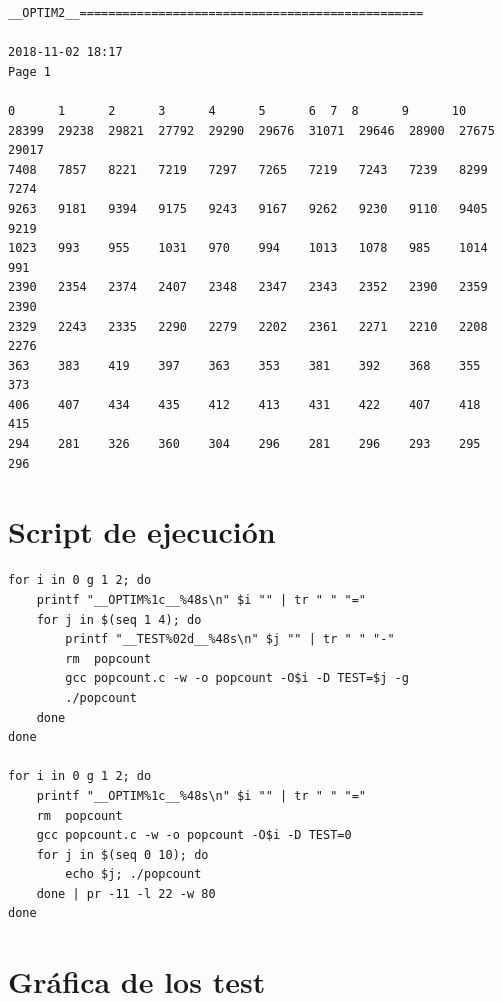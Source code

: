 \begin{lstlisting}[frame=single]
__OPTIM2__================================================

2018-11-02 18:17                                                          Page 1

0      1      2	     3	    4	   5	  6	 7	8      9      10
28399  29238  29821  27792  29290  29676  31071	 29646	28900  27675  29017
7408   7857   8221   7219   7297   7265	  7219	 7243	7239   8299   7274
9263   9181   9394   9175   9243   9167	  9262	 9230	9110   9405   9219
1023   993    955    1031   970	   994	  1013	 1078	985    1014   991
2390   2354   2374   2407   2348   2347	  2343	 2352	2390   2359   2390
2329   2243   2335   2290   2279   2202	  2361	 2271	2210   2208   2276
363    383    419    397    363	   353	  381	 392	368    355    373
406    407    434    435    412	   413	  431	 422	407    418    415
294    281    326    360    304	   296	  281	 296	293    295    296
	\end{lstlisting}

	\section[Script de ejecución]{Script de ejecución}

	\lstset{language=bash}
	\begin{lstlisting}[frame=single] 
for i in 0 g 1 2; do 
	printf "__OPTIM%1c__%48s\n" $i "" | tr " " "="
	for j in $(seq 1 4); do 
		printf "__TEST%02d__%48s\n" $j "" | tr " " "-"       
		rm  popcount       
		gcc popcount.c -w -o popcount -O$i -D TEST=$j -g         
		./popcount     
	done   
done  

for i in 0 g 1 2; do        
	printf "__OPTIM%1c__%48s\n" $i "" | tr " " "="       
	rm  popcount       
	gcc popcount.c -w -o popcount -O$i -D TEST=0     
	for j in $(seq 0 10); do        
		echo $j; ./popcount     
	done | pr -11 -l 22 -w 80   
done
	\end{lstlisting}

	\section[Gráfica de los test]{Gráfica de los test}
	
